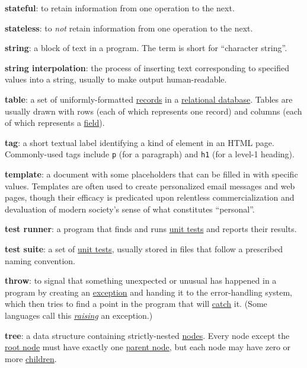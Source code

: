 \textbf{stateful}: to retain information from one operation to the next.

\textbf{stateless}: to \emph{not} retain information from one operation
to the next.

\textbf{string}: a block of text in a program. The term is short for
``character string''.

\textbf{string interpolation}: the process of inserting text
corresponding to specified values into a string, usually to make output
human-readable.

\textbf{table}: a set of uniformly-formatted
\protect\hyperlink{g:record}{records} in a
\protect\hyperlink{g:relational-database}{relational database}. Tables
are usually drawn with rows (each of which represents one record) and
columns (each of which represents a \protect\hyperlink{g:field}{field}).

\textbf{tag}: a short textual label identifying a kind of element in an
HTML page. Commonly-used tags include \texttt{p} (for a paragraph) and
\texttt{h1} (for a level-1 heading).

\textbf{template}: a document with some placeholders that can be filled
in with specific values. Templates are often used to create personalized
email messages and web pages, though their efficacy is predicated upon
relentless commercialization and devaluation of modern society's sense
of what constitutes ``personal''.

\textbf{test runner}: a program that finds and runs
\protect\hyperlink{g:unit-test}{unit tests} and reports their results.

\textbf{test suite}: a set of \protect\hyperlink{g:unit-test}{unit
tests}, usually stored in files that follow a prescribed naming
convention.

\textbf{throw}: to signal that something unexpected or unusual has
happened in a program by creating an
\protect\hyperlink{g:exception}{exception} and handing it to the
error-handling system, which then tries to find a point in the program
that will \protect\hyperlink{g:catch}{catch} it. (Some languages call
this \emph{\protect\hyperlink{g:raise}{raising}} an exception.)

\textbf{tree}: a data structure containing strictly-nested
\protect\hyperlink{g:node}{nodes}. Every node except the
\protect\hyperlink{g:root-node}{root node} must have exactly one
\protect\hyperlink{g:parent-node}{parent node}, but each node may have
zero or more \protect\hyperlink{g:child-node}{children}.

